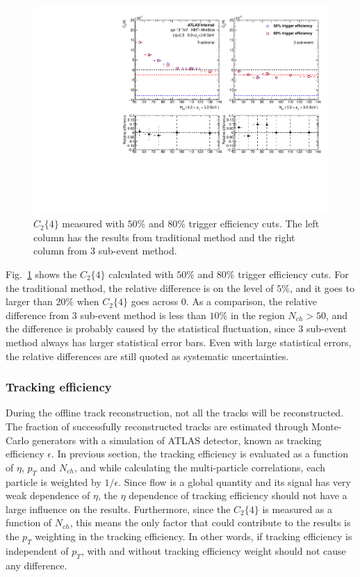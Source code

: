 
\begin{figure}[H]
\centering
\includegraphics[width=0.8\linewidth]{figs/sec_sys/pp13/sys_pp13_trigEff.pdf}
\caption{$C_{2}\{4\}$ measured with $50\%$ and $80\%$ trigger efficiency cuts. The left column has the results from traditional method and the right column from 3 sub-event method.}
\label{fig:sys_pp13_trigEff}
\end{figure}
Fig.~\ref{fig:sys_pp13_trigEff} shows the $C_{2}\{4\}$ calculated with $50\%$ and $80\%$ trigger efficiency cuts. For the traditional method, the relative difference is on the level of $5\%$, and it goes to larger than $20\%$ when $C_{2}\{4\}$ goes across 0. As a comparison, the relative difference from 3 sub-event method is less than $10\%$ in the region $N_{ch}>50$, and the difference is probably caused by the statistical fluctuation, since 3 sub-event method always has larger statistical error bars. Even with large statistical errors, the relative differences are still quoted as systematic uncertainties.



\subsubsection{Tracking efficiency}
During the offline track reconstruction, not all the tracks will be reconstructed. The fraction of successfully reconstructed tracks are estimated through Monte-Carlo generators with a simulation of ATLAS detector, known as tracking efficiency $\epsilon$. In previous section, the tracking efficiency is evaluated as a function of $\eta$, $p_{T}$ and $N_{ch}$, and while calculating the multi-particle correlations, each particle is weighted by $1/\epsilon$. Since flow is a global quantity and its signal has very weak dependence of $\eta$, the $\eta$ dependence of tracking efficiency should not have a large influence on the results. Furthermore, since the $C_{2}\{4\}$ is measured as a function of $N_{ch}$, this means the only factor that could contribute to the results is the $p_{T}$ weighting in the tracking efficiency. In other words, if tracking efficiency is independent of $p_{T}$, with and without tracking efficiency weight should not cause any difference.

